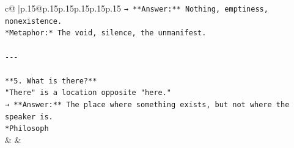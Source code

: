 \documentclass{article}
\begin{document}
{\begin{supertabular}{c@{$\;$}|p{.15\linewidth}@{}p{.15\linewidth}p{.15\linewidth}p{.15\linewidth}p{.15\linewidth}p{.15\linewidth}}
{{{\texttt{→ **Answer:** Nothing, emptiness, nonexistence.  } \\
\texttt{*Metaphor:* The void, silence, the unmanifest.} \\
\\ 
\texttt{{-}{-}{-}} \\
\\ 
\texttt{**5. What is there?**  } \\
\texttt{"There" is a location opposite "here."  } \\
\texttt{→ **Answer:** The place where something exists, but not where the speaker is.  } \\
\texttt{*Philosoph} \\
            }
        }
    }
    & & \\ \\


\end{supertabular}}
\end{document}
